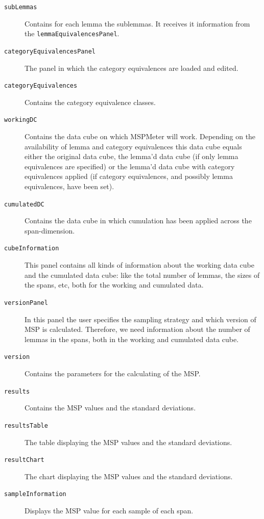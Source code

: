 \documentclass{article}
\begin{document}
\begin{description}
\item[\texttt{subLemmas}] Contains for each lemma the sublemmas. It receives it information from the \texttt{lemmaEquivalencesPanel}.

\item[\texttt{categoryEquivalencesPanel}] The panel in which the category equivalences are loaded and edited. 

\item[\texttt{categoryEquivalences}] Contains the category equivalence classes. 

\item[\texttt{workingDC}] Contains the data cube on which MSPMeter will work. Depending on the availability of lemma and category equivalences this data cube equals either the original data cube, the lemma'd data cube (if only lemma equivalences are specified) or the lemma'd data cube with category equivalences applied (if category equivalences, and possibly lemma equivalences, have been set).

\item[\texttt{cumulatedDC}] Contains the data cube in which cumulation has been applied across the span-dimension. 

\item[\texttt{cubeInformation}] This panel contains all kinds of information about the working data cube and the cumulated data cube: like the total number of lemmas, the sizes of the spans, etc, both for the working and cumulated data.

\item[\texttt{versionPanel}] In this panel the user specifies the sampling strategy and which version of MSP is calculated. Therefore, we need information about the number of lemmas in the spans, both in the working and cumulated data cube.

\item[\texttt{version}] Contains the parameters for the calculating of the MSP. 

\item[\texttt{results}] Contains the MSP values and the standard deviations. 

\item[\texttt{resultsTable}] The table displaying the MSP values and the standard deviations.

\item[\texttt{resultChart}] The chart displaying the MSP values and the standard deviations.

\item[\texttt{sampleInformation}] Displays the MSP value for each sample of each span.
\end{description}
\end{document}
